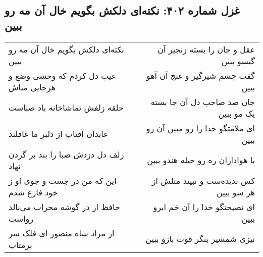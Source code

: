 \begin{center}
\section*{غزل شماره ۴۰۲: نکته‌ای دلکش بگویم خال آن مه رو ببین}
\label{sec:sh402}
\begin{longtable}{l p{0.5cm} r}
نکته‌ای دلکش بگویم خال آن مه رو ببین
&&
عقل و جان را بسته زنجیر آن گیسو ببین
\\
عیب دل کردم که وحشی وضع و هرجایی مباش
&&
گفت چشم شیرگیر و غنج آن آهو ببین
\\
حلقه زلفش تماشاخانه باد صباست
&&
جان صد صاحب دل آن جا بسته یک مو ببین
\\
عابدان آفتاب از دلبر ما غافلند
&&
ای ملامتگو خدا را رو مبین آن رو ببین
\\
زلف دل دزدش صبا را بند بر گردن نهاد
&&
با هواداران ره رو حیله هندو ببین
\\
این که من در جست و جوی او ز خود فارغ شدم
&&
کس ندیده‌ست و نبیند مثلش از هر سو ببین
\\
حافظ ار در گوشه محراب می‌نالد رواست
&&
ای نصیحتگو خدا را آن خم ابرو ببین
\\
از مراد شاه منصور ای فلک سر برمتاب
&&
تیزی شمشیر بنگر قوت بازو ببین
\\
\end{longtable}
\end{center}
